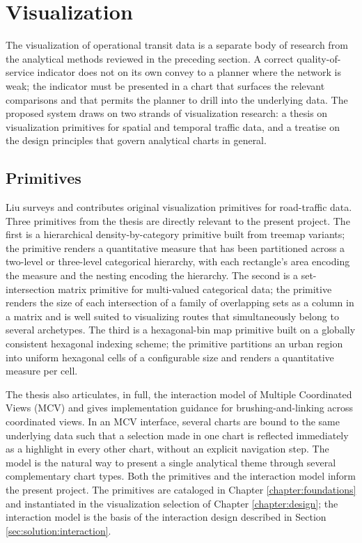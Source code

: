 \section{Visualization}
\label{sec:related:viz}

The visualization of operational transit data is a separate body of research from the
analytical methods reviewed in the preceding section. A correct quality-of-service
indicator does not on its own convey to a planner where the network is weak; the
indicator must be presented in a chart that surfaces the relevant comparisons and that
permits the planner to drill into the underlying data. The proposed system draws on two
strands of visualization research: a thesis on visualization primitives for spatial and
temporal traffic data, and a treatise on the design principles that govern analytical
charts in general.

\subsection{Primitives}
\label{sec:related:viz:primitives}

Liu \cite{liu2022} surveys and contributes original visualization primitives for
road-traffic data. Three primitives from the thesis are directly relevant to the present
project. The first is a hierarchical density-by-category primitive built from treemap
variants; the primitive renders a quantitative measure that has been partitioned across a
two-level or three-level categorical hierarchy, with each rectangle's area encoding the
measure and the nesting encoding the hierarchy. The second is a set-intersection matrix
primitive for multi-valued categorical data; the primitive renders the size of each
intersection of a family of overlapping sets as a column in a matrix and is well suited
to visualizing routes that simultaneously belong to several archetypes. The third is a
hexagonal-bin map primitive built on a globally consistent hexagonal indexing scheme; the
primitive partitions an urban region into uniform hexagonal cells of a configurable size
and renders a quantitative measure per cell.

The thesis also articulates, in full, the interaction model of Multiple Coordinated Views
(MCV) and gives implementation guidance for brushing-and-linking across coordinated
views. In an MCV interface, several charts are bound to the same underlying data such
that a selection made in one chart is reflected immediately as a highlight in every
other chart, without an explicit navigation step. The model is the natural way to
present a single analytical theme through several complementary chart types. Both the
primitives and the interaction model inform the present project. The primitives are
cataloged in Chapter \ref{chapter:foundations} and instantiated in the visualization
selection of Chapter \ref{chapter:design}; the interaction model is the basis of the
interaction design described in Section \ref{sec:solution:interaction}.

